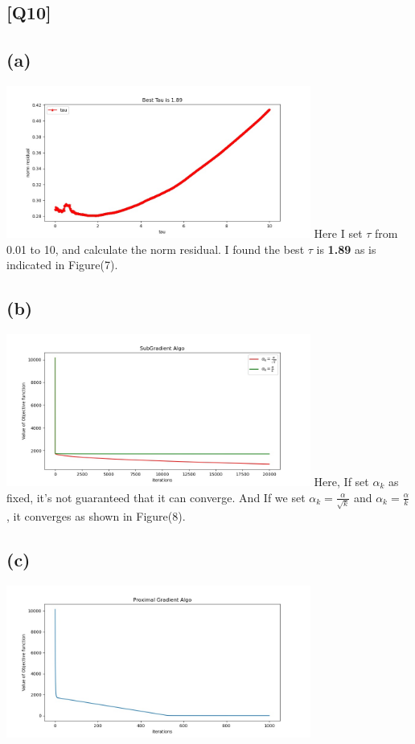 \documentclass[12pt, a4 paper]{article}
\begin{document}
    \begin{framed}
        \section{[Q10]}
        \subsection{(a)}
        {\centering
        \includegraphics[width=10cm, height=5cm]{Q10_1.jpg}
        }
        \indent Here I set $\tau$ from 0.01 to 10, and calculate the norm residual.
        I found the best $\tau$ is \textbf{1.89} as is indicated in Figure(7).

        \subsection{(b)}
        {\centering
        \includegraphics[width=10cm, height=5cm]{Q10_2.jpg}
        }
        Here, If set $\alpha_{k}$ as fixed, it's not guaranteed that it can 
        converge. And If we set $\alpha_{k}=\frac{\alpha}{\sqrt{k}}$ and $\alpha_{k}
        =\frac{\alpha}{k}$, it converges as shown in Figure(8).

        \subsection{(c)}
        {\centering
        \includegraphics[width=10cm, height=5cm]{Q10_3.jpg}
        }


\end{framed}
\end{document}
